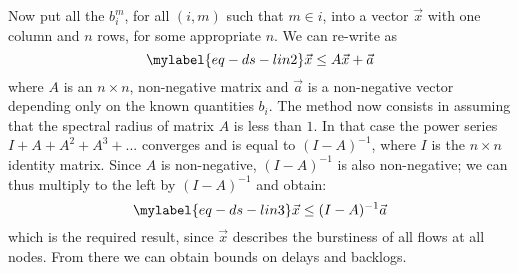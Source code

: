 Now put all the $b_i^m$, for all $(i,m)$ such that $m \in i$, into
a vector $\vec{x}$ with one column and $n$ rows, for some
appropriate $n$. We can re-write  as
\begin{equation}\mylabel{eq-ds-lin2}
\vec{x} \leq A \vec{x} + \vec{a}
\end{equation}
where $A$ is an $n \times n$, non-negative matrix and $\vec{a}$ is
a non-negative vector depending only on the known quantities
$b_i$. The method now consists in assuming that the spectral
radius of matrix $A$ is less than $1$. In that case the power
series $I + A + A^2 + A^3 + ...$ converges and is equal to
$(I-A)^{-1}$, where $I$ is the $n \times n$ identity matrix. Since
$A$ is non-negative, $(I-A)^{-1}$ is also non-negative; we can
thus multiply  to the left by $(I-A)^{-1}$ and
obtain:
\begin{equation}\mylabel{eq-ds-lin3}
\vec{x} \leq (I-A)^{-1} \vec{a}
\end{equation}
which is the required result, since $\vec{x}$ describes the
burstiness of all flows at all nodes. From there we can obtain
bounds on delays and backlogs.

